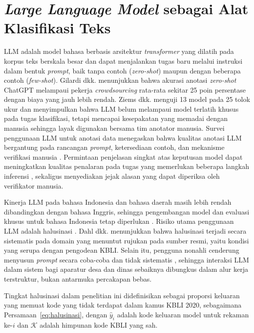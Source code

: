 \documentclass[12pt,a4paper]{report}
\begin{document}
\section{\textit{Large Language Model} sebagai Alat Klasifikasi Teks}
\label{sec:llm}

LLM adalah model bahasa berbasis arsitektur \textit{transformer} yang dilatih pada korpus teks berskala besar dan dapat menjalankan tugas baru melalui instruksi dalam bentuk \textit{prompt}, baik tanpa contoh (\textit{zero-shot}) maupun dengan beberapa contoh (\textit{few-shot}). Gilardi dkk. \cite{gilardi2023chatgpt} menunjukkan bahwa akurasi anotasi \textit{zero-shot} ChatGPT melampaui pekerja \textit{crowdsourcing} rata-rata sekitar 25 poin persentase dengan biaya yang jauh lebih rendah. Ziems dkk. \cite{ziems2024css} menguji 13 model pada 25 tolok ukur dan menyimpulkan bahwa LLM belum melampaui model terlatih khusus pada tugas klasifikasi, tetapi mencapai kesepakatan yang memadai dengan manusia sehingga layak digunakan bersama tim anotator manusia. Survei penggunaan LLM untuk anotasi data menegaskan bahwa kualitas anotasi LLM bergantung pada rancangan \textit{prompt}, ketersediaan contoh, dan mekanisme verifikasi manusia \cite{tan2024annotation}. Permintaan penjelasan singkat atas keputusan model dapat meningkatkan kualitas penalaran pada tugas yang memerlukan beberapa langkah inferensi \cite{wei2022cot}, sekaligus menyediakan jejak alasan yang dapat diperiksa oleh verifikator manusia.

Kinerja LLM pada bahasa Indonesia dan bahasa daerah masih lebih rendah dibandingkan dengan bahasa Inggris, sehingga pengembangan model dan evaluasi khusus untuk bahasa Indonesia tetap diperlukan \cite{cahyawijaya2024cendol}. Risiko utama penggunaan LLM adalah halusinasi \cite{ji2023hallucination}. Dahl dkk. \cite{dahl2024legal} menunjukkan bahwa halusinasi terjadi secara sistematis pada domain yang menuntut rujukan pada sumber resmi, yaitu kondisi yang serupa dengan pengodean KBLI. Selain itu, pengguna nonahli cenderung menyusun \textit{prompt} secara coba-coba dan tidak sistematis \cite{zamfirescu2023johnny}, sehingga interaksi LLM dalam sistem bagi aparatur desa dan dinas sebaiknya dibungkus dalam alur kerja terstruktur, bukan antarmuka percakapan bebas.

Tingkat halusinasi dalam penelitian ini didefinisikan sebagai proporsi keluaran yang memuat kode yang tidak terdapat dalam kamus KBLI 2020, sebagaimana Persamaan~\eqref{eq:halusinasi}, dengan $\hat{y}_i$ adalah kode keluaran model untuk rekaman ke-$i$ dan $\mathcal{K}$ adalah himpunan kode KBLI yang sah.
\end{document}
